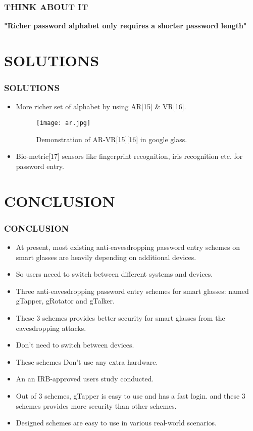 \documentclass{beamer}
\begin{document}
\begin{frame}
\frametitle{ THINK ABOUT IT }

\textbf{\Large"Richer password alphabet only requires a shorter password length"}

\end{frame}

\section{SOLUTIONS}
\begin{frame}
\frametitle{ SOLUTIONS }
\begin{itemize}
\item More richer set of alphabet by using AR[15] \& VR[16].
\begin{figure}
    \begin{center}
        \texttt{[image: ar.jpg]}
        \caption{Demonstration of AR-VR[15][16] in google glass.}
    \end{center}
\end{figure}
\item  Bio-metric[17] sensors like fingerprint recognition, iris recognition etc. for password entry.
\end{itemize}
\end{frame}

\section{CONCLUSION}
\begin{frame}
\frametitle{CONCLUSION}
\begin{itemize}
\justifying
\item At present, most existing anti-eavesdropping password entry
schemes on smart glasses are heavily depending on additional devices.
\item So users neeed to switch between different systems and devices.
\item Three anti-eavesdropping password
entry schemes for smart glasses: named gTapper, gRotator
and gTalker.
\item These 3 schemes provides better security for smart glasses from  the eavesdropping attacks.
\item Don't need to switch between devices.
\item These schemes Don't use any extra hardware.
\item An an IRB-approved users study conducted.
\item Out of 3 schemes, gTapper is easy to use and has a fast login.
and these 3 schemes provides more security than other schemes.
\item Designed schemes are easy to use in various real-world scenarios.
\end{itemize}
\end{frame}
\end{document}
